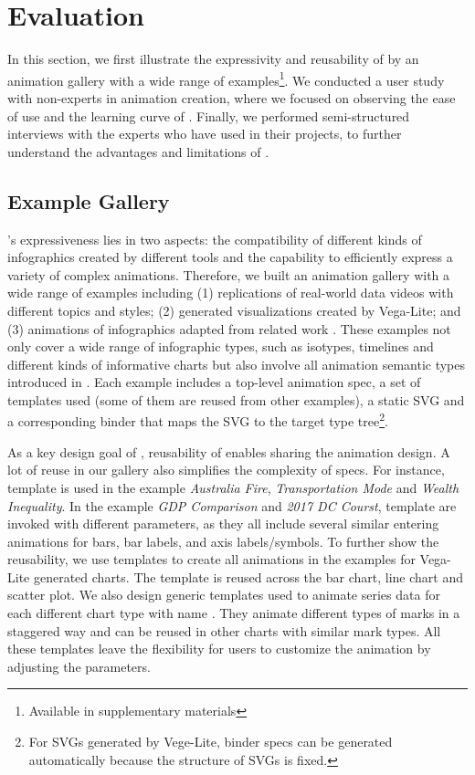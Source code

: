\section{Evaluation}
\label{sec:eval}

In this section, we first illustrate the expressivity and reusability of \gaia{} by an animation gallery with a wide range of examples\footnote{Available in supplementary materials}. 
We conducted a user study with non-experts in animation creation, where we focused on observing the ease of use and the learning curve of \gaia{}. 
Finally, we performed semi-structured interviews with the experts who have used \gaia{} in their projects, to further understand the advantages and limitations of \gaia{}.

\subsection{Example Gallery}

\gaia{}'s expressiveness lies in two aspects: the compatibility of different kinds of infographics created by different tools and the capability to efficiently express a variety of complex animations.
Therefore, we built an animation gallery with a wide range of examples including
(1) replications of real-world data videos with different topics and styles; 
(2) generated visualizations created by Vega-Lite; and 
(3) animations of infographics adapted from related work \cite{ge2020canis,wang2021animated, cui2021mixed}.
These examples not only cover a wide range of infographic types, such as isotypes, timelines and different kinds of informative charts but also involve all animation semantic types introduced in \cite{cheng2022investigating}.
Each example includes a top-level animation spec, a set of templates used (some of them are reused from other examples), a static SVG and a corresponding binder that maps the SVG to the target type tree\footnote{For SVGs generated by Vege-Lite, binder specs can be generated automatically because the structure of SVGs is fixed.}.

As a key design goal of \gaia{}, reusability of \gaia{} enables sharing the animation design.
A lot of reuse in our gallery also simplifies the complexity of specs.
For instance, template  is used in the example \textit{Australia Fire}, \textit{Transportation Mode} and \textit{Wealth Inequality}.
In the example \textit{GDP Comparison} and \textit{2017 DC Courst}, template  are invoked with different parameters, as they all include several similar entering animations for bars, bar labels, and axis labels/symbols.
To further show the reusability, we use templates to create all animations in the examples for Vega-Lite generated charts.
The template  is reused across the bar chart, line chart and scatter plot.
We also design generic templates used to animate series data for each different chart type with name .
They animate different types of marks in a staggered way and can be reused in other charts with similar mark types.
All these templates leave the flexibility for users to customize the animation by adjusting the parameters.

